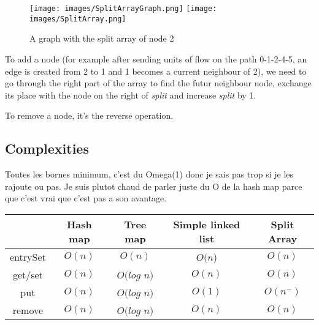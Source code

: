 \begin{figure}[!h]
\texttt{[image: images/SplitArrayGraph.png]}\hfill
\texttt{[image: images/SplitArray.png]}
\caption{A graph with the split array of node 2}
\end{figure}

To add a node (for example after sending units of flow on the path 0-1-2-4-5, an edge is created from 2 to 1 and 1 becomes a current neighbour of 2), we need to go through the right part of the array to find the futur neighbour node, exchange its place with the node on the right of \textit{split} and increase \textit{split} by 1. \newline

To remove a node, it's the reverse operation.


\subsection{Complexities}

Toutes les bornes minimum, c'est du Omega(1) donc je sais pas trop si je les rajoute ou pas. Je suis plutot chaud de parler juste du O de la hash map parce que c'est vrai que c'est pas a son avantage. \newline

\begin{tabular}{|c|c|c|c|c|}
	\hline
     & \textbf{Hash map} & \textbf{Tree map} & \textbf{Simple linked list} & \textbf{Split Array} \\
     \hline	
   entrySet & $O(n)$ & $O(n)$ & $O(n$) & $O(n)$\\
   get/set & $O(n)$ & $O(log$ $n)$ & $O(n)$ & $O(n)$\\
   put & $O(n)$ & $O(log$ $n)$ & $O(1)$ & $O(n^-)$\\
   remove & $O(n)$ & $O(log$ $n)$ & $O(n)$ & $O(n)$\\
   \hline
\end{tabular}